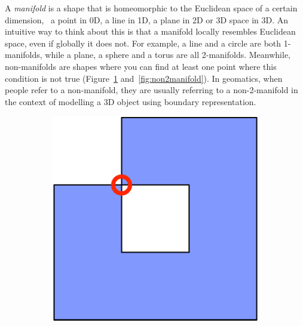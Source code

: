 A \emph{manifold} is a shape that is homeomorphic to the Euclidean space of a certain dimension, \ie\ a point in 0D, a line in 1D, a plane in 2D or 3D space in 3D.
An intuitive way to think about this is that a manifold locally resembles Euclidean space, even if globally it does not.
For example, a line and a circle are both 1-manifolds, while a plane, a sphere and a torus are all 2-manifolds.
Meanwhile, non-manifolds are shapes where you can find at least one point where this condition is not true (Figure~\ref{subfig:nonmanifold-0} and~\ref{fig:non2manifold}).
In geomatics, when people refer to a non-manifold, they are usually referring to a non-2-manifold in the context of modelling a 3D object using boundary representation.

\begin{figure}
\centering
\begin{subfigure}[b]{0.3\linewidth}
\includegraphics[width=\linewidth]{figs/nonmanifold-0}
\caption{}%
\label{subfig:nonmanifold-0}
\end{subfigure}
\quad
\begin{subfigure}[b]{0.3\linewidth}

\end{subfigure}
\end{figure}

